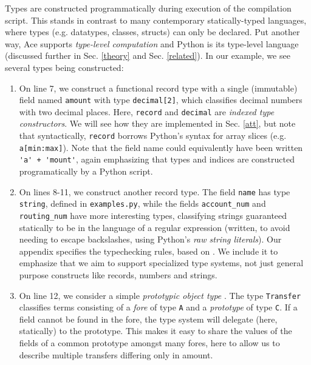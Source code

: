 \documentclass[10pt,preprint]{sigplanconf}
\begin{document}
Types are constructed programmatically during execution of the compilation script. This stands in contrast to many  contemporary statically-typed languages, where types (e.g. datatypes, classes, structs) can only be declared. Put another way, Ace supports \emph{type-level computation} and Python is its type-level language (discussed further in Sec. \ref{theory} and Sec. \ref{related}). 
In our example, we see several types being constructed:
\begin{enumerate}
\item On line 7, we construct a functional record type with a single (immutable) field named \verb|amount| with type \verb|decimal[2]|, which classifies decimal numbers with two decimal places. Here, \verb|record| and \verb|decimal| are \emph{indexed type constructors}. We will see how they are implemented in Sec. \ref{att}, but note that syntactically, \verb|record| borrows Python's syntax for array slices (e.g. \verb|a[min:max]|). Note that the field name could equivalently have been written \lstinline{'a' + 'mount'}, again emphasizing that types and indices are constructed programatically by a Python script.
\item On lines 8-11, we construct another record type. The field \verb|name| has type \verb|string|, defined in \verb|examples.py|, while the fields \verb|account_num| and \verb|routing_num| have more interesting types, classifying strings guaranteed statically to be in the language of a regular expression  (written, to avoid needing to escape backslashes, using Python's \emph{raw string literals}). Our appendix specifies the typechecking rules, based on \cite{fulton-thesis}. We include it to emphasize that we aim to support specialized type systems,  not just general purpose constructs like records, numbers and strings.
\item 
On line 12, we consider a simple \emph{prototypic object type} \cite{Lie86}. The type \verb|Transfer| classifies terms consisting of a \emph{fore} of type \verb|A| and a \emph{prototype} of type \verb|C|. If a field cannot be found in the fore, the type system will delegate (here, statically) to the prototype. This makes it easy to share the values of the fields of a common prototype amongst many fores, here to allow us to describe multiple transfers differing only in amount.
\end{enumerate}
\end{document}
